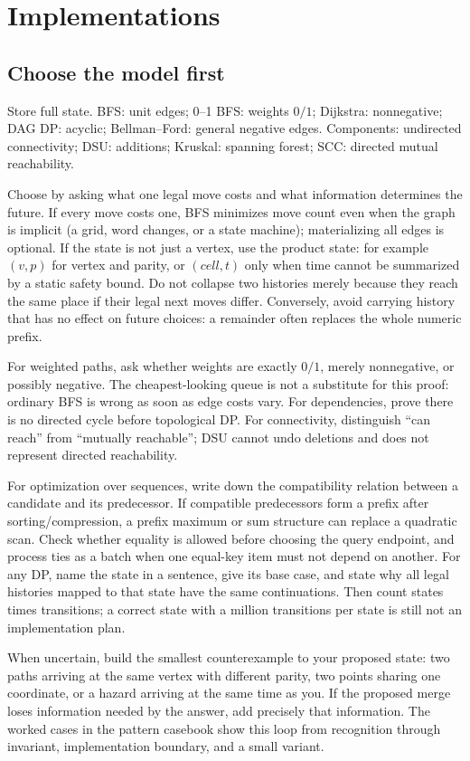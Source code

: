 \chapter{Implementations}

\section{Choose the model first}
Store full state. BFS: unit edges; 0--1 BFS: weights $0/1$; Dijkstra:
nonnegative; DAG DP: acyclic; Bellman--Ford: general negative edges.
Components: undirected connectivity; DSU: additions; Kruskal: spanning forest;
SCC: directed mutual reachability.

Choose by asking what one legal move costs and what information determines
the future. If every move costs one, BFS minimizes move count even when the
graph is implicit (a grid, word changes, or a state machine); materializing
all edges is optional. If the state is not just a vertex, use the product
state: for example $(v, p)$ for vertex and parity, or $(cell, t)$ only when
time cannot be summarized by a static safety bound. Do not collapse two
histories merely because they reach the same place if their legal next moves
differ. Conversely, avoid carrying history that has no effect on future
choices: a remainder often replaces the whole numeric prefix.

For weighted paths, ask whether weights are exactly $0/1$, merely
nonnegative, or possibly negative. The cheapest-looking queue is not a
substitute for this proof: ordinary BFS is wrong as soon as edge costs vary.
For dependencies, prove there is no directed cycle before topological DP.
For connectivity, distinguish ``can reach'' from ``mutually reachable''; DSU
cannot undo deletions and does not represent directed reachability.

For optimization over sequences, write down the compatibility relation
between a candidate and its predecessor. If compatible predecessors form a
prefix after sorting/compression, a prefix maximum or sum structure can
replace a quadratic scan. Check whether equality is allowed before choosing
the query endpoint, and process ties as a batch when one equal-key item must
not depend on another. For any DP, name the state in a sentence, give its
base case, and state why all legal histories mapped to that state have the
same continuations. Then count states times transitions; a correct state
with a million transitions per state is still not an implementation plan.

When uncertain, build the smallest counterexample to your proposed state:
two paths arriving at the same vertex with different parity, two points
sharing one coordinate, or a hazard arriving at the same time as you. If
the proposed merge loses information needed by the answer, add precisely
that information. The worked cases in the pattern casebook show this loop
from recognition through invariant, implementation boundary, and a small
variant.

